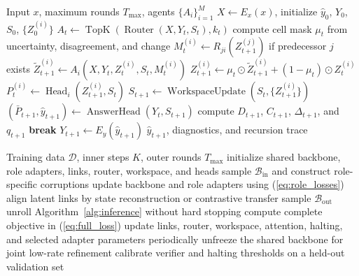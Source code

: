 \documentclass[10pt,a4paper,twocolumn]{article}
\newcommand{\TopK}{\operatorname{TopK}}
\begin{document}
\begin{algorithm}[t]
\caption{MA-TRM inference with sparse routing and disagreement-driven recursion}
\label{alg:inference}
\small
\begin{algorithmic}[1]
\Require Input $x$, maximum rounds $T_{\max}$, agents $\{A_i\}_{i=1}^{M}$
\State $X\gets E_x(x)$, initialize $\hat y_0$, $Y_0$, $S_0$, $\{Z_0^{(i)}\}$
  \State $A_t\gets \TopK(\operatorname{Router}(X,Y_t,S_t),k_t)$
  \State compute cell mask $\mu_t$ from uncertainty, disagreement, and change
    \State $M_t^{(i)}\gets R_{j i}(Z_{t+1}^{(j)})$ if predecessor $j$ exists
    \State $\widetilde Z_{t+1}^{(i)}\gets A_i(X,Y_t,Z_t^{(i)},S_t,M_t^{(i)})$
    \State $Z_{t+1}^{(i)}\gets \mu_t\odot\widetilde Z_{t+1}^{(i)}+(1-\mu_t)\odot Z_t^{(i)}$
    \State $P_t^{(i)}\gets \operatorname{Head}_i(Z_{t+1}^{(i)},S_t)$
  \EndFor
  \State $S_{t+1}\gets \operatorname{WorkspaceUpdate}(S_t,\{Z_{t+1}^{(i)}\})$
  \State $(\bar P_{t+1},\hat y_{t+1})\gets \operatorname{AnswerHead}(Y_t,S_{t+1})$
  \State compute $D_{t+1}$, $C_{t+1}$, $\Delta_{t+1}$, and $q_{t+1}$
    \State \textbf{break}
  \EndIf
  \State $Y_{t+1}\gets E_y(\hat y_{t+1})$
\EndFor
\State \Return $\hat y_{t+1}$, diagnostics, and recursion trace
\end{algorithmic}
\end{algorithm}

\begin{algorithm}[t]
\caption{Inner-outer co-optimization}
\label{alg:training}
\small
\begin{algorithmic}[1]
\Require Training data $\mathcal{D}$, inner steps $K$, outer rounds $T_{\max}$
\State initialize shared backbone, role adapters, links, router, workspace, and heads
    \State sample $\mathcal{B}_{\mathrm{in}}$ and construct role-specific corruptions
    \State update backbone and role adapters using (\ref{eq:role_losses})
    \State align latent links by state reconstruction or contrastive transfer
  \EndFor
  \State sample $\mathcal{B}_{\mathrm{out}}$
  \State unroll Algorithm~\ref{alg:inference} without hard stopping
  \State compute complete objective in (\ref{eq:full_loss})
  \State update links, router, workspace, attention, halting, and selected adapter parameters
  \State periodically unfreeze the shared backbone for joint low-rate refinement
\EndFor
\State calibrate verifier and halting thresholds on a held-out validation set
\end{algorithmic}
\end{algorithm}
\end{document}
